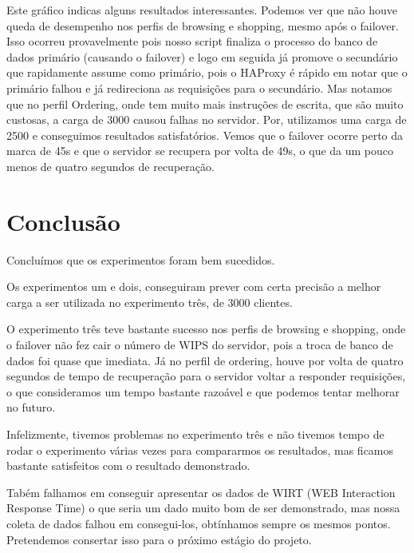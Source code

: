 \documentclass[11pt,twoside]{article}
\begin{document}
Este gráfico indicas alguns resultados interessantes. Podemos ver que não houve queda de desempenho nos perfis de browsing e shopping, mesmo após o failover. Isso ocorreu provavelmente pois nosso script finaliza o processo do banco de dados primário (causando o failover) e logo em seguida já promove o secundário que rapidamente assume como primário, pois o HAProxy é rápido em notar que o primário falhou e já redireciona as requisições para o secundário.
Mas notamos que no perfil Ordering, onde tem muito mais instruções de escrita, que são muito custosas, a carga de 3000 causou falhas no servidor. Por, utilizamos uma carga de 2500 e conseguimos resultados satisfatórios. Vemos que o failover ocorre perto da marca de 45s e que o servidor se recupera por volta de 49s, o que da um pouco menos de quatro segundos de recuperação.

\section{Conclus\~ao}
Concluímos que os experimentos foram bem sucedidos.

Os experimentos um e dois, conseguiram prever com certa precisão a melhor carga a ser utilizada no experimento três, de 3000 clientes.

O experimento três teve bastante sucesso nos perfis de browsing e shopping, onde o failover não fez cair o número de WIPS do servidor, pois a troca de banco de dados foi quase que imediata. Já no perfil de ordering, houve por volta de quatro segundos de tempo de recuperação para o servidor voltar a responder requisições, o que consideramos um tempo bastante razoável e que podemos tentar melhorar no futuro.

Infelizmente, tivemos problemas no experimento três e não tivemos tempo de rodar o experimento várias vezes para compararmos os resultados, mas ficamos bastante satisfeitos com o resultado demonstrado.

Tabém falhamos em conseguir apresentar os dados de WIRT (WEB Interaction Response Time) o que seria um dado muito bom de ser demonstrado, mas nossa coleta de dados falhou em consegui-los, obtínhamos sempre os mesmos pontos. Pretendemos consertar isso para o próximo estágio do projeto.
\end{document}
